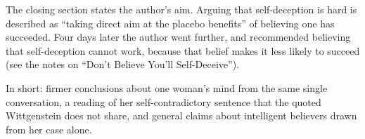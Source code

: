 \begin{afterword}
The closing section states the author's aim. Arguing that self-deception is hard is described as ``taking direct aim at the placebo benefits'' of believing one has succeeded. Four days later the author went further, and recommended believing that self-deception cannot work, because that belief makes it less likely to succeed (see the notes on ``Don't Believe You'll Self-Deceive'').

In short: firmer conclusions about one woman's mind from the same single conversation, a reading of her self-contradictory sentence that the quoted Wittgenstein does not share, and general claims about intelligent believers drawn from her case alone.
\end{afterword}
